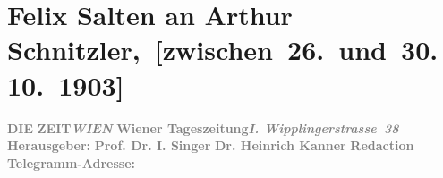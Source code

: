 

         
         \renewcommand{\erwaehntePersonen}{Personen: Heinrich Kanner, Ernst Raupach, Felix Salten, Isidor Singer}
         \renewcommand{\erwaehnteInstitutionen}{Institutionen: Die Zeit}
         \renewcommand{\erwaehnteOrte}{Orte: Raimund-Theater, Wien, Wipplingerstraße}
         \renewcommand{\erwaehnteWerke}{Werke: Der Müller und sein Kind. Volksdrama in fünf Aufzügen}
               \section[ Felix Salten an Arthur Schnitzler, {[}zwischen 26. und 30. 10. 1903{]}]{ Felix Salten an Arthur
               Schnitzler, {[}zwischen 26. und 30. 10. 1903{]}}\nopagebreak{}\rehead{ }\begin{ledgroupsized}[t]{13cm}\normalsize\beginnumbering \toendnotes[C]{\smallbreak\pagebreak[2]} 
\toendnotes[C]{\smallbreak}\pstart
           \noindent{}{\pb}\textcolor{gray}{\textbf{DIE}}\pend
           \pstart
           \textcolor{gray}{\textbf{ZEIT}}\hfill \textcolor{gray}{\textbf{\emph{WIEN}}}\pend
           \pstart
           \textcolor{gray}{\textbf{Wiener Tageszeitung}}\hfill \textcolor{gray}{\textbf{\emph{I. Wipplingerstrasse 38}}}\pend
           \pstart
           \textcolor{gray}{\textbf{Herausgeber:}}\pend
           \pstart
           \textcolor{gray}{\textbf{\textbf{Prof. Dr. I. Singer}}}\pend
           \pstart
           \textcolor{gray}{\textbf{\textbf{Dr. Heinrich Kanner}}}\pend
           \pstart
           \textcolor{gray}{\textbf{\textbf{Redaction}}}\pend
           \pstart
           \textcolor{gray}{\textbf{Telegramm-Adresse: \so{,}{ }}}\pend

\end{ledgroupsized}
